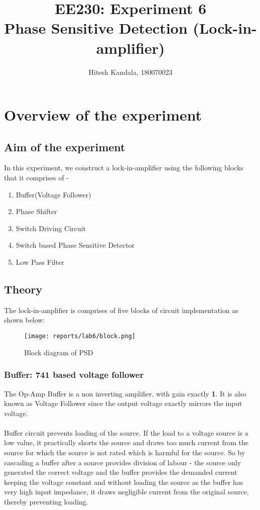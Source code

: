 \documentclass[12pt]{article}
\title{EE230: Experiment 6\\
Phase Sensitive Detection (Lock-in-amplifier)}
\author{Hitesh Kandala, 180070023}
\begin{document}
\maketitle
\tableofcontents
\clearpage

\section{Overview of the experiment}

    \subsection{Aim of the experiment}
        In this experiment, we construct a lock-in-amplifier using the following blocks that it comprises of -
        \begin{enumerate}
            \item Buffer(Voltage Follower)
            \item Phase Shifter
            \item Switch Driving Circuit
            \item Switch based Phase Sensitive Detector
            \item Low Pass Filter
        \end{enumerate}
    \subsection{Theory}
        The lock-in-amplifier is comprises of five blocks of circuit implementation as shown below:
        \begin{figure}[H]
            \centering
            \texttt{[image: reports/lab6/block.png]}
            \caption{Block diagram of PSD}
            \label{fig:instru}
        \end{figure}
        
        \subsubsection{Buffer: 741 based voltage follower}
            The Op-Amp Buffer is a non inverting amplifier, with gain exactly \textbf{1}. It is also known as Voltage Follower since the output voltage exactly mirrors the input voltage.\\\\
            Buffer circuit prevents loading of the source. If the load to a voltage source is a low value, it practically shorts the source and draws too much current from the source for which the source is not rated which is harmful for the source. So by cascading a buffer after a source provides division of labour - the source only generated the correct voltage and the buffer provides the demanded current keeping the voltage constant and without loading the source as the buffer has very high input impedance, it draws negligible current from the original source, thereby preventing loading.
        
\end{document}
